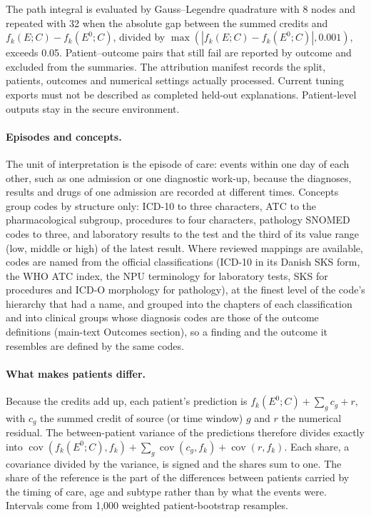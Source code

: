 The path integral is evaluated by Gauss--Legendre quadrature with 8 nodes and
repeated with 32 when the absolute gap between the summed credits and
$f_k(E;C)-f_k(E^0;C)$, divided by $\max(|f_k(E;C)-f_k(E^0;C)|,0.001)$, exceeds
0.05. Patient--outcome pairs that still fail are reported by outcome and
excluded from the summaries. The attribution manifest records the split, patients, outcomes and numerical
settings actually processed. Current tuning exports must not be described as
completed held-out explanations. Patient-level outputs stay in the secure environment.

\paragraph{Episodes and concepts.} The unit of interpretation is the episode of
care: events within one day of each other, such as one admission or one
diagnostic work-up, because the diagnoses, results and drugs of one admission
are recorded at different times. Concepts group codes by structure only: ICD-10
to three characters, ATC to the pharmacological subgroup, procedures to four
characters, pathology SNOMED codes to three, and laboratory results to the test
and the third of its value range (low, middle or high) of the latest result.
Where reviewed mappings are available, codes are named from the official classifications (ICD-10 in its Danish SKS
form, the WHO ATC index, the NPU terminology for laboratory tests, SKS for
procedures and ICD-O morphology for pathology), at the finest level of the
code's hierarchy that had a name, and grouped into the chapters of each
classification and into clinical groups whose diagnosis codes are those of the
outcome definitions (main-text Outcomes section), so a finding and the
outcome it resembles are defined by the same codes. 

\paragraph{What makes patients differ.} Because the credits add up, each
patient's prediction is $f_k(E^0;C)+\sum_g c_{g}+r$, with $c_g$ the summed
credit of source (or time window) $g$ and $r$ the numerical residual. The
between-patient variance of the predictions therefore divides exactly into
$\operatorname{cov}(f_k(E^0;C),f_k)+\sum_g\operatorname{cov}(c_g,f_k)
+\operatorname{cov}(r,f_k)$. Each share, a covariance divided by the variance,
is signed and the shares sum to one. The share of the reference is the part of
the differences between patients carried by the timing of care, age and
subtype rather than by what the events were. Intervals come from 1,000
weighted patient-bootstrap resamples.

